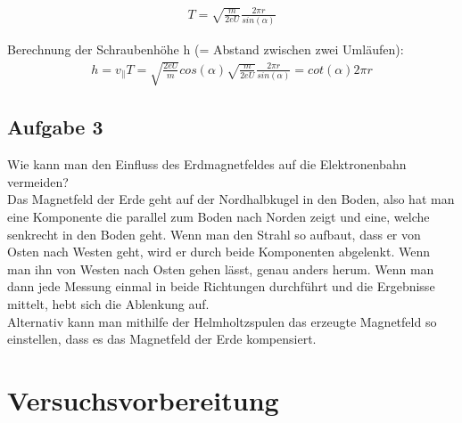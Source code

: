 \documentclass[a4paper,10pt]{scrartcl}
\begin{document}
	
	
	\begin{align}
	T=\sqrt{\frac{m}{2eU}}\frac{2\pi r}{sin(\alpha)}
	\end{align}
	
	\newpage
	
	Berechnung der Schraubenhöhe h (= Abstand zwischen zwei Umläufen):
	\begin{align}
	h=v_{\parallel}T=\sqrt{\frac{2eU}{m}}cos(\alpha)\sqrt{\frac{m}{2eU}}\frac{2\pi r}{sin(\alpha)}=cot(\alpha)2\pi r
	\end{align}
	
	\subsection{Aufgabe 3}
	
	Wie kann man den Einfluss des Erdmagnetfeldes auf die Elektronenbahn vermeiden?\\
	Das Magnetfeld der Erde geht auf der Nordhalbkugel in den Boden, also hat man eine Komponente die parallel zum Boden nach Norden zeigt und eine, welche senkrecht in den Boden geht. Wenn man den Strahl so aufbaut, dass er von Osten nach Westen geht, wird er durch beide Komponenten abgelenkt. Wenn man ihn von Westen nach Osten gehen lässt, genau anders herum. Wenn man dann jede Messung einmal in beide Richtungen durchführt und die Ergebnisse mittelt, hebt sich die Ablenkung auf.\\
	Alternativ kann man mithilfe der Helmholtzspulen das erzeugte Magnetfeld so einstellen, dass es das Magnetfeld der Erde kompensiert.
	\newpage
	\section{Versuchsvorbereitung}
\end{document}
